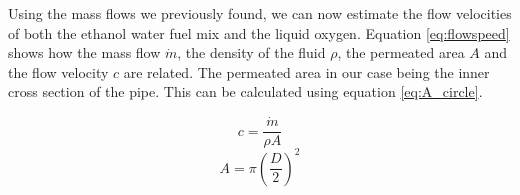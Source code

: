                 Using the mass flows we previously found, we can now estimate the flow velocities of both the ethanol water fuel mix and the liquid oxygen. Equation \ref{eq:flowspeed} shows how the mass flow $\dot{m}$, the density of the fluid $\rho$, the permeated area $A$ and the flow velocity $c$ are related. The permeated area in our case being the inner cross section of the pipe. This can be calculated using equation \ref{eq:A_circle}.
                \begin{multicols}{2}
                    \begin{equation}
                        c = \frac{\dot{m}}{\rho A} \label{eq:flowspeed}
                    \end{equation}
                    \begin{equation}
                        A = \pi\left(\frac{D}{2}\right)^2 \label{eq:A_circle}
                    \end{equation}
                \end{multicols}
